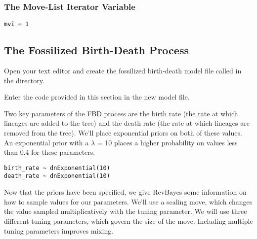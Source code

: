 \medskip
\subsubsection{The Move-List Iterator Variable}\label{subsub:RB-mviVar}




{\tt \begin{snugshade*}
\begin{lstlisting}
mvi = 1
\end{lstlisting}
\end{snugshade*}}

\bigskip

\subsection{The Fossilized Birth-Death Process}\label{subsect:RB-ModelFBD}

{\begin{framed}
Open your text editor and create the fossilized birth-death model file called {\textcolor{red}{}} in the  directory.

Enter the \Rev code provided in this section in the new model file.
\end{framed}}

Two key parameters of the FBD process are the birth rate (the rate at which lineages are added to the tree) and the death rate (the rate at which lineages are removed from the tree). We'll place exponential priors on both of these values. An exponential prior with a $\lambda$ =  10 places a higher probability on values less than 0.4 for these parameters. 

{\tt \begin{snugshade*}
\begin{lstlisting}
birth_rate ~ dnExponential(10)
death_rate ~ dnExponential(10)
\end{lstlisting}
\end{snugshade*}}

Now that the priors have been specified, we give RevBayes some information on how to sample values for our parameters. We'll use a scaling move, which changes the value sampled multiplicatively with the tuning parameter. We will use three different tuning parameters, which govern the size of the move. Including multiple tuning parameters improves mixing. 

